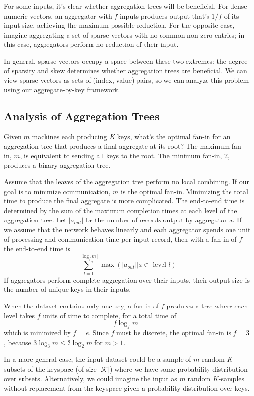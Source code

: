\documentclass[twocolumn, 10pt]{article}
\newcommand{\keyspace}{\mathcal{K}}
\begin{document}
For some inputs, it's clear whether aggregation trees will be beneficial.
For dense numeric vectors, an aggregator with $f$ inputs produces output
that's $1/f$ of its input size, achieving the maximum possible reduction.
For the opposite case, imagine aggregating a set of sparse vectors with
no common non-zero entries; in this case, aggregators perform no reduction of
their input.

In general, sparse vectors occupy a space between these two extremes: the
degree of sparsity and skew determines whether aggregation trees are
beneficial.  We can view sparse vectors as sets of (index, value) pairs, so we
can analyze this problem using our aggregate-by-key framework.

\subsection{Analysis of Aggregation Trees}

Given $m$ machines each producing $K$ keys, what's the optimal fan-in for an
aggregation tree that produces a final aggregate at its root?  The maximum
fan-in, $m$, is equivalent to sending all keys to the root.  The minimum
fan-in, 2, produces a binary aggregation tree.

Assume that the leaves of the aggregation tree perform no local combining.
If our goal is to minimize communication, $m$ is the optimal fan-in.
Minimizing the total time to produce the final aggregate is more complicated.
The end-to-end time is determined by the sum of the maximum completion times
at each level of the aggregation tree.  Let $|a_{out}|$ be the number of
records output by aggregator $a$.  If we assume that the network behaves
linearly and each aggregator spends one unit of processing and communication
time per input record, then with a fan-in of $f$ the end-to-end time is
\[
    \sum_{l=1}^{\lceil\log_fm\rceil}
        \max
        \left(
            |a_{out}| | a \in \text{ level } l
        \right)
\]
If aggregators perform complete aggregation over their inputs, their output
size is the number of unique keys in their inputs.

When the dataset contains only one key, a fan-in of $f$ produces a tree
where each level takes $f$ units of time to complete, for a total time of
\[
    f \log_f m,
\]
which is minimized by $f = e$.  Since $f$ must be discrete, the optimal fan-in
is $f = 3$, because $3 \log_3 m \leq 2 \log_2 m$ for $m > 1$.

In a more general case, the input dataset could be a sample of $m$ random
$K$-subsets of the keyspace (of size $|\keyspace|$) where we have some
probability distribution over subsets.  Alternatively, we could imagine the
input as $m$ random $K$-samples without replacement from the keyspace given
a probability distribution over keys.
\end{document}
